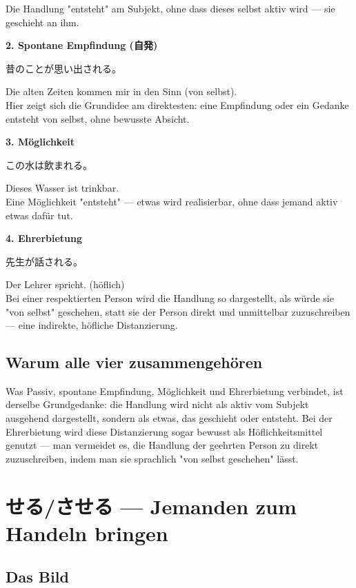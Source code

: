 \documentclass[12pt]{book}
\begin{document}
Die Handlung "entsteht" am Subjekt, ohne dass dieses selbst aktiv wird — sie geschieht an ihm.

\textbf{2. Spontane Empfindung (自発)}
\par\quad 昔のことが思い出される。\\
\par\quad Die alten Zeiten kommen mir in den Sinn (von selbst).\\

Hier zeigt sich die Grundidee am direktesten: eine Empfindung oder ein Gedanke entsteht von selbst, ohne bewusste Absicht.

\textbf{3. Möglichkeit}
\par\quad この水は飲まれる。\\
\par\quad Dieses Wasser ist trinkbar.\\

Eine Möglichkeit "entsteht" — etwas wird realisierbar, ohne dass jemand aktiv etwas dafür tut.

\textbf{4. Ehrerbietung}
\par\quad 先生が話される。\\
\par\quad Der Lehrer spricht. (höflich)\\

Bei einer respektierten Person wird die Handlung so dargestellt, als würde sie "von selbst" geschehen, statt sie der Person direkt und unmittelbar zuzuschreiben — eine indirekte, höfliche Distanzierung.

\section*{Warum alle vier zusammengehören}

Was Passiv, spontane Empfindung, Möglichkeit und Ehrerbietung verbindet, ist derselbe Grundgedanke: die Handlung wird nicht als aktiv vom Subjekt ausgehend dargestellt, sondern als etwas, das geschieht oder entsteht. Bei der Ehrerbietung wird diese Distanzierung sogar bewusst als Höflichkeitsmittel genutzt — man vermeidet es, die Handlung der geehrten Person zu direkt zuzuschreiben, indem man sie sprachlich "von selbst geschehen" lässt.


\chapter{せる/させる — Jemanden zum Handeln bringen}

\section*{Das Bild}
\end{document}
